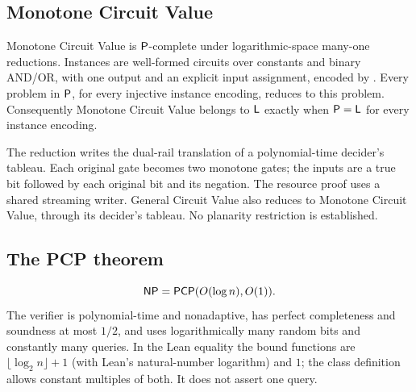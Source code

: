 \begin{result}
\subsection{Monotone Circuit Value}
Monotone Circuit Value is $\mathsf{P}$-complete under logarithmic-space many-one
reductions. Instances are well-formed circuits over constants and binary AND/OR,
with one output and an explicit input assignment, encoded by
. Every problem in $\mathsf{P}$, for every injective
instance encoding, reduces to this problem. Consequently Monotone Circuit Value
belongs to $\mathsf{L}$ exactly when $\mathsf{P}=\mathsf{L}$ for every instance encoding.

The reduction writes the dual-rail translation of a polynomial-time decider's
tableau. Each original gate becomes two monotone gates; the inputs are a true
bit followed by each original bit and its negation. The resource proof uses a
shared streaming writer. General Circuit Value also reduces to Monotone Circuit
Value, through its decider's tableau. No planarity restriction is established.
\citep{Goldschlager1977}
\end{result}

\begin{result}
\subsection{The PCP theorem}
\[
\mathsf{NP}=\mathsf{PCP}(O(\log n),O(1)).
\]
The verifier is polynomial-time and nonadaptive, has perfect completeness and
soundness at most $1/2$, and uses logarithmically many random bits and constantly
many queries. In the Lean equality the bound functions are
$\lfloor\log_2 n\rfloor+1$ (with Lean's natural-number logarithm) and $1$;
the class definition allows constant multiples of both. It does not assert
one query.\citep{Dinur2007}
\end{result}

